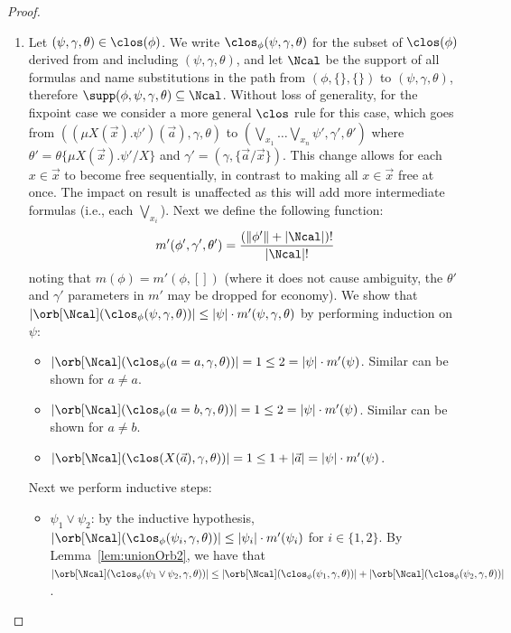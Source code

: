 \begin{proof}
\begin{enumerate}
\begin{itemize}
			The case for $(\nu X(\vec x).\phi')(\vec a)$ is similar.
		\end{itemize}		
		\item 
												Let $(\psi, \gamma, \theta) \in \clos(\phi)$. 
		We write $\clos_\phi(\psi, \gamma, \theta)$ for the subset of $\clos(\phi)$ derived from and including $(\psi,\gamma, \theta)$, and let $\Ncal$ be the support of all formulas and name substitutions in the path from $(\phi,\{\}, \{\})$ to $(\psi,\gamma, \theta)$,
		therefore $\supp(\phi, \psi, \gamma, \theta) \subseteq \Ncal$.
				Without loss of generality, for the fixpoint case we consider a more general $\clos$ rule for this case, which goes from $((\mu X(\vec x).\psi')(\vec a),\gamma, \theta)$ to $(\bigvee\nolimits_{x_1}\dots\bigvee\nolimits_{x_n}\psi',\gamma',\theta')$ where $\theta' = \theta\{\mu X(\vec x).\psi' / X\}$ and $\gamma' = (\gamma, \{\vec a / \vec x\})$. 
		This change allows for each $x \in \vec x$ to become free sequentially, in contrast to making all $x \in \vec x$ free at once. 
		The impact on result is unaffected as this will add more intermediate formulas (i.e., each $\bigvee_{x_i}$).
				Next we define the following function:
		\[
		m'(\phi', \gamma', \theta') = \frac{(\|\phi'\| + |\Ncal|)!}{|\Ncal|!}
		\]
		noting that $m(\phi) = m'(\phi, [])$ (where it does not cause ambiguity, the $\theta'$ and $\gamma'$ parameters in $m'$ may be dropped for economy).
		We show that $|\orb[\Ncal](\clos_\phi(\psi, \gamma, \theta))| \le |\psi|\cdot m'(\psi, \gamma, \theta)$
				by performing induction on $\psi$:
				\begin{itemize}
			\item $|\orb[\Ncal](\clos_\phi(a = a, \gamma, \theta))|= 1 \le 2 = |\psi|\cdot m'(\psi)$.
			Similar can be shown for $a \neq a$.
			\item $|\orb[\Ncal](\clos_\phi(a = b, \gamma, \theta))| = 1 \le 2 = |\psi|\cdot m'(\psi)$.
			Similar can be shown for $a \neq b$.
			\item $|\orb[\Ncal](\clos(X(\vec a), \gamma, \theta))| = 1 \le 1 + |\vec a| = |\psi|\cdot m'(\psi)$.
		\end{itemize}
		Next we perform inductive steps:
		\begin{itemize}
			\item $\psi_1 \lor \psi_2$: by the inductive hypothesis, $|\orb[\Ncal](\clos_\phi(\psi_i,\gamma, \theta))| \le |\psi_i|\cdot m'(\psi_i)$ for $i \in \{1, 2\}$.
			By Lemma~\ref{lem:unionOrb2},
						we have that $|\orb[\Ncal](\clos_\phi(\psi_1 \lor \psi_2,\gamma, \theta))| \le |\orb[\Ncal](\clos_\phi(\psi_1, \gamma, \theta))| + |\orb[\Ncal](\clos_\phi(\psi_2,\gamma, \theta))|$.

\end{itemize}
\end{enumerate}
\end{proof}
